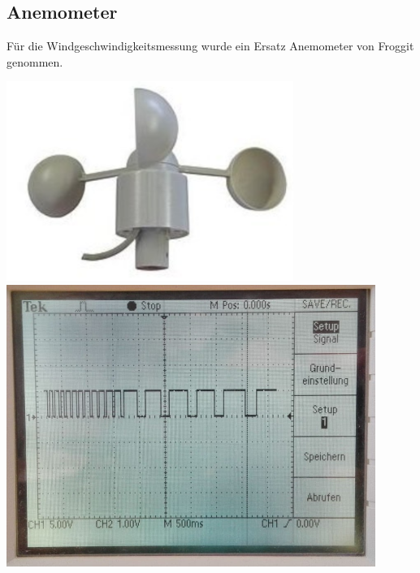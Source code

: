 \subsection{Anemometer}
\begin{minipage}{0.5\textwidth}
Für die Windgeschwindigkeitsmessung wurde ein Ersatz Anemometer von Froggit genommen. \blindtext
\end{minipage}
\begin{minipage}{0.49\textwidth}
\centering
\includegraphics[width=0.7\textwidth]{graphics/Anemometer/anemometer.png}
\label{fig:anemometer}
\vspace{0.5cm}
\includegraphics[width = 0.9\textwidth]{graphics/Anemometer/oszilloskop_anenometer_puls.png}
\label{fig:rechteckpuls_anemometer}
\end{minipage}

